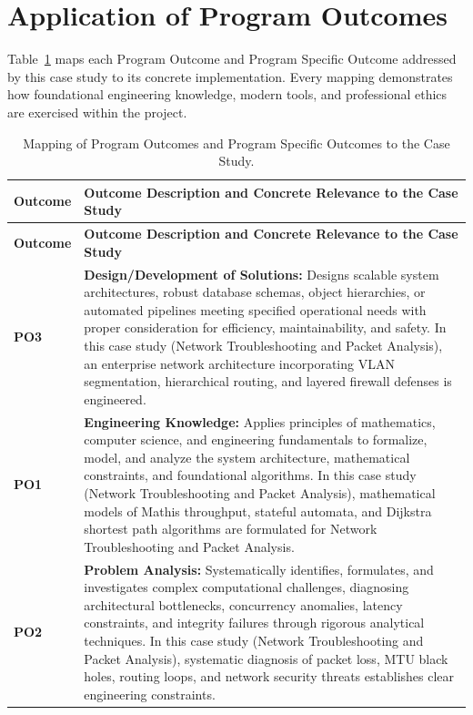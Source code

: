 \section{Application of Program Outcomes}
Table~\ref{tab:po} maps each Program Outcome and Program Specific Outcome addressed by this case study to its concrete implementation. Every mapping demonstrates how foundational engineering knowledge, modern tools, and professional ethics are exercised within the project.

{\small
\begin{longtable}{@{}>{\centering\arraybackslash}p{1.8cm} p{13.2cm}@{}}
    \caption{Mapping of Program Outcomes and Program Specific Outcomes to the Case Study.}\label{tab:po}\\
    \toprule
    \textbf{Outcome} & \textbf{Outcome Description and Concrete Relevance to the Case Study} \\
    \midrule
    \endfirsthead
    \toprule
    \textbf{Outcome} & \textbf{Outcome Description and Concrete Relevance to the Case Study} \\
    \midrule
    \endhead
\textbf{PO3} & \textbf{Design/Development of Solutions:} Designs scalable system architectures, robust database schemas, object hierarchies, or automated pipelines meeting specified operational needs with proper consideration for efficiency, maintainability, and safety. In this case study (Network Troubleshooting and Packet Analysis), an enterprise network architecture incorporating VLAN segmentation, hierarchical routing, and layered firewall defenses is engineered. \\
    \addlinespace
\textbf{PO1} & \textbf{Engineering Knowledge:} Applies principles of mathematics, computer science, and engineering fundamentals to formalize, model, and analyze the system architecture, mathematical constraints, and foundational algorithms. In this case study (Network Troubleshooting and Packet Analysis), mathematical models of Mathis throughput, stateful automata, and Dijkstra shortest path algorithms are formulated for Network Troubleshooting and Packet Analysis. \\
    \addlinespace
\textbf{PO2} & \textbf{Problem Analysis:} Systematically identifies, formulates, and investigates complex computational challenges, diagnosing architectural bottlenecks, concurrency anomalies, latency constraints, and integrity failures through rigorous analytical techniques. In this case study (Network Troubleshooting and Packet Analysis), systematic diagnosis of packet loss, MTU black holes, routing loops, and network security threats establishes clear engineering constraints. \\

\end{longtable}}
